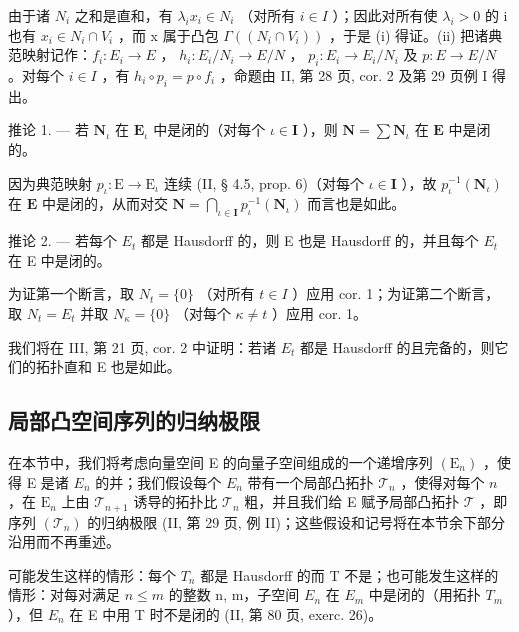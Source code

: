 由于诸 \(N_{i}\) 之和是直和，有 \(\lambda_{i}x_{i} \in N_{i}\) （对所有 \(i \in I\) ）；因此对所有使 \(\lambda_{i} > 0\) 的 i 也有 \(x_{i} \in N_{i} \cap V_{i}\) ，而 x 属于凸包 \(\Gamma((N_{i} \cap V_{i}))\) ，于是 (i) 得证。(ii) 把诸典范映射记作：\(f_{i}: E_{i} \to E\) ， \(h_{i}: E_{i}/N_{i} \to E/N\) ， \(p_{i}: E_{i} \to E_{i}/N_{i}\) 及 \(p: E \to E/N\) 。对每个 \(i \in I\) ，有 \(h_{i} \circ p_{i} = p \circ f_{i}\) ，命题由 II, 第 28 页, cor. 2 及第 29 页例 I 得出。

推论 1. --- 若 \(\mathbf{N}_{\iota}\) 在 \(\mathbf{E}_{\iota}\) 中是闭的（对每个 \(\iota \in \mathbf{I}\) ），则 \(\mathbf{N} = \sum \mathbf{N}_{\iota}\) 在 \(\mathbf{E}\) 中是闭的。

因为典范映射 \(p_{\iota} : \mathrm{E} \to \mathrm{E}_{\iota}\) 连续 (II, § 4.5, prop. 6)（对每个 \(\iota \in \mathbf{I}\) ），故 \(p_{\iota}^{-1}(\mathbf{N}_{\iota})\) 在 \(\mathbf{E}\) 中是闭的，从而对交 \(\mathbf{N} = \bigcap_{\iota \in \mathbf{I}} p_{\iota}^{-1}(\mathbf{N}_{\iota})\) 而言也是如此。

推论 2. --- 若每个 \(E_{t}\) 都是 Hausdorff 的，则 E 也是 Hausdorff 的，并且每个 \(E_{t}\) 在 E 中是闭的。

为证第一个断言，取 \(N_{t} = \{0\}\) （对所有 \(t \in I\) ）应用 cor. 1；为证第二个断言，取 \(N_{t} = E_{t}\) 并取 \(N_{\kappa} = \{0\}\) （对每个 \(\kappa \neq t\) ）应用 cor. 1。

我们将在 III, 第 21 页, cor. 2 中证明：若诸 \(E_{t}\) 都是 Hausdorff 的且完备的，则它们的拓扑直和 E 也是如此。

\subsection{局部凸空间序列的归纳极限}

在本节中，我们将考虑向量空间 E 的向量子空间组成的一个递增序列 \((\mathrm{E}_{n})\) ，使得 E 是诸 \(E_{n}\) 的并；我们假设每个 \(E_{n}\) 带有一个局部凸拓扑 \(\mathcal{T}_n\) ，使得对每个 \(n\) ，在 \(\mathrm{E}_n\) 上由 \(\mathcal{T}_{n+1}\) 诱导的拓扑比 \(\mathcal{T}_n\) 粗，并且我们给 E 赋予局部凸拓扑 \(\mathcal{T}\) ，即序列 \((\mathcal{T}_n)\) 的归纳极限 (II, 第 29 页, 例 II)；这些假设和记号将在本节余下部分沿用而不再重述。

可能发生这样的情形：每个 \(T_{n}\) 都是 Hausdorff 的而 T 不是；也可能发生这样的情形：对每对满足 \(n \leqslant m\) 的整数 n, m，子空间 \(E_{n}\) 在 \(E_{m}\) 中是闭的（用拓扑 \(T_{m}\) ），但 \(E_{n}\) 在 E 中用 T 时不是闭的 (II, 第 80 页, exerc. 26)。

